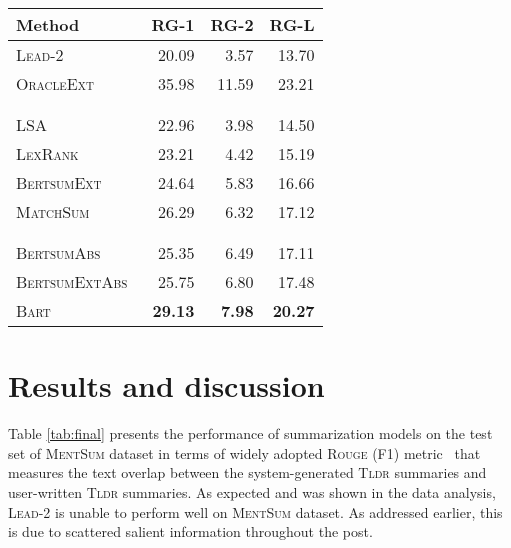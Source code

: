 \documentclass[10pt, a4paper]{article}
\newcommand{\tldr}{\textsc{Tldr}}
\newcommand{\rgf}{\textsc{Rouge (F1)}}
\newcommand{\mentsum}{\textsc{MentSum}}
\begin{document}
\begin{table*}[t]
\renewcommand*{\arraystretch}{1.05}
\centering 
\begin{tabular}{lrrr}
\toprule
 Method                    & \textsc{RG-1}  & \textsc{RG-2}  & \textsc{RG-L}  \\
\midrule
\textsc{Lead-2}             &  20.09    & 3.57  & 13.70     \\
 \textsc{OracleExt}             &  35.98    & 11.59  & 23.21 \\ \vspace{-0.3cm}
\\ \hdashline \vspace{-0.3cm}  \\
 \textsc{LSA}~\cite{Steinberger2004LSA}                  &  22.96    & 3.98  & 14.50     \\

 \textsc{LexRank}~\cite{Erkan2004LexRankGL}                        &  23.21 & 4.42  & 15.19 \\

 \textsc{BertsumExt}~\cite{Liu2019TextSW}                        & 24.64 & 5.83  &  16.66  \\
 
\textsc{MatchSum}~\cite{Zhong2020ExtractiveSA}                        & 26.29 & 6.32  &  17.12  \\ \vspace{-0.3cm} \\  \hdashline \vspace{-0.3cm}    \\ 

 \textsc{BertsumAbs}~\cite{Liu2019TextSW}              &  25.35 & 6.49  &  17.11 \\
 
  \textsc{BertsumExtAbs}~\cite{Liu2019TextSW}              & 25.75  &  6.80 & 17.48  \\
  
\textsc{Bart}~\cite{Lewis2020BARTDS}              &  \textbf{29.13} & \textbf{7.98}  & \textbf{20.27}  \\



\bottomrule
\end{tabular}
\caption{\rgf{} results on \mentsum 's test set.}
\label{tab:final}
\end{table*}




\section{Results and discussion}
\label{sec:results}
Table \ref{tab:final} presents the performance of summarization models on the test set of \mentsum{} dataset in terms of widely adopted \textsc{Rouge (F1)} metric~\cite{Lin2004ROUGEAP} that measures the text overlap between the system-generated \tldr{} summaries and user-written \tldr{} summaries. As expected and was shown in the data analysis, \textsc{Lead-2} is unable to perform well on \mentsum{} dataset. As addressed earlier, this is due to scattered salient information throughout the post. 
\end{document}
